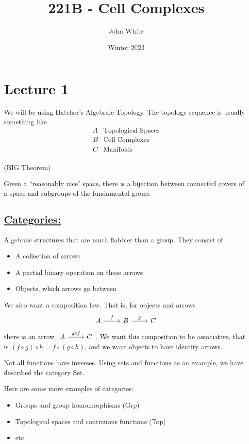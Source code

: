 \documentclass[x11names,reqno,14pt]{extarticle}
\title{221B - Cell Complexes}
\author{John White}
\date{Winter 2023}
\begin{document}
\section*{Lecture 1}

We will be using Hatcher's Algebraic Topology. The topology sequence is usually something like 
\begin{align*}
A & \text{Topological Spaces} \\
B & \text{Cell Complexes} \\
C & \text{Manifolds} \\
\end{align*}

\thm (BIG Theorem)

Given a ``reasonably nice" space, there is a bijection between connected covers of a space and subgroups of the fundamental group. 

\subsection*{\underline{Categories:}}

Algebraic structures that are much flabbier than a group. They consist of 
\begin{itemize}
\item A collection of arrows
\item A partial binary operation on these arrows
\item Objects, which arrows go between
\end{itemize}
We also want a composition law. That is, for objects and arrows
\[
\begin{tikzcd}
A \ar[r, "f"] & B \ar[r, "g"] & C 
\end{tikzcd}
\]
there is an arrow $\begin{tikzcd} A \ar[r, "g \circ f"]&  C \end{tikzcd}$. We want this composition to be associative, that is $(f \circ g) \circ h = f \circ (g \circ h)$, and we want objects to have identity arrows. 

Not all functions have inverses. Using sets and functions as an example, we have described the category Set. 

Here are some more examples of categories: 
\exm

\begin{itemize}
\item Groups and group homomorphisms (Grp)
\item Topological spaces and continuous functions (Top)
\item etc. 
\end{itemize}
\end{document}
